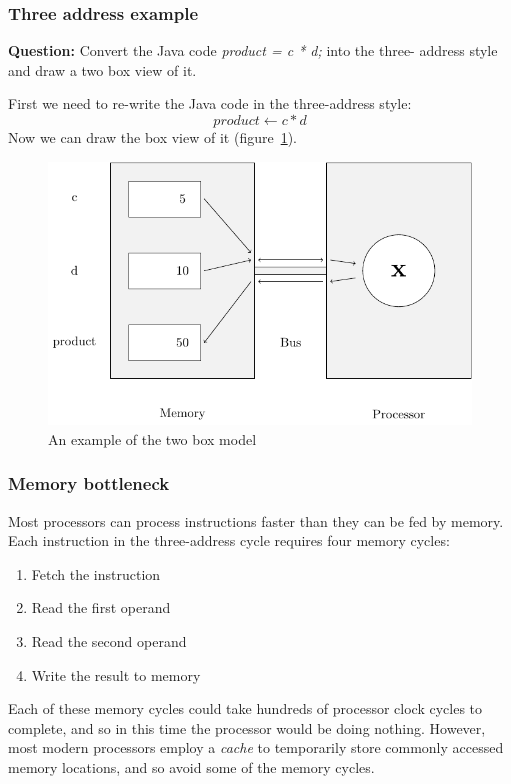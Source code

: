 \subsubsection{Three address example}

{\bf Question:} Convert the Java code {\it product = c * d;} into the three-
address style and draw a two box view of it.

First we need to re-write the Java code in the three-address style:
\[
	product \leftarrow c * d
\]
Now we can draw the box view of it (figure~\ref{figure:two_box_model}).

\begin{figure}[ht!]
	\centering
	\includegraphics[width=\textwidth]{two_box_model_diagram.pdf}
	\caption{An example of the two box model}
	\label{figure:two_box_model}
\end{figure}

\subsubsection{Memory bottleneck}
Most processors can process instructions faster than they can be fed by memory. Each instruction in the three-address cycle requires four memory cycles:

\begin{enumerate}
    \item Fetch the instruction
    \item Read the first operand
    \item Read the second operand
    \item Write the result to memory
\end{enumerate}

Each of these memory cycles could take hundreds of processor clock cycles to complete, and so in this time the processor would be doing nothing. However, most modern processors employ a {\it cache} to temporarily store commonly accessed memory locations, and so avoid some of the memory cycles. 

